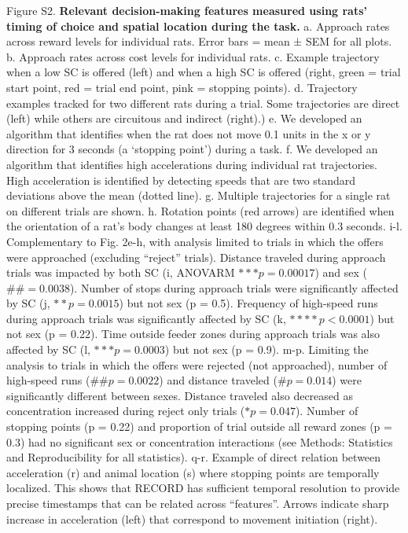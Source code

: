 \documentclass{article}
\begin{document}
\begin{singlespace}
\noindent Figure S2. \textbf{Relevant decision-making features measured using rats’ timing of choice and spatial location during the task.} 
a. Approach rates across reward levels for individual rats. Error bars = mean ± SEM for all plots.
b. Approach rates across cost levels for individual rats.
c. Example trajectory when a low SC is offered (left) and when a high SC is offered (right, green
= trial start point, red = trial end point, pink = stopping points).
d. Trajectory examples tracked for two different rats during a trial. Some trajectories are direct
(left) while others are circuitous and indirect (right).)
e. We developed an algorithm that identifies when the rat does not move 0.1 units in the x or y
direction for 3 seconds (a \lq{stopping point}\rq) during a task.
f. We developed an algorithm that identifies high accelerations during individual rat trajectories.
High acceleration is identified by detecting speeds that are two standard deviations above the
mean (dotted line).
g. Multiple trajectories for a single rat on different trials are shown.
h. Rotation points (red arrows) are identified when the orientation of a rat’s body changes at least
180 degrees within 0.3 seconds.
i-l. Complementary to Fig. 2e-h, with analysis limited to trials in which the offers were approached
(excluding “reject” trials). Distance traveled during approach trials was impacted by both SC (i,
ANOVARM $***p = 0.00017$) and sex ($\#\# = 0.0038$). Number of stops during approach trials were
significantly affected by SC (j, $**p = 0.0015$) but not sex (p = 0.5). Frequency of high-speed runs
during approach trials was significantly affected by SC (k, $****p < 0.0001$) but not sex (p = 0.22).
Time outside feeder zones during approach trials was also affected by SC (l, $***p = 0.0003$) but
not sex (p = 0.9).
m-p. Limiting the analysis to trials in which the offers were rejected (not approached), number of
high-speed runs ($\#\#p = 0.0022$) and distance traveled ($\#p = 0.014$) were significantly different
between sexes. Distance traveled also decreased as concentration increased during reject only
trials ($*p = 0.047$). Number of stopping points (p = 0.22) and proportion of trial outside all reward
zones (p = 0.3) had no significant sex or concentration interactions (see Methods: Statistics and Reproducibility for all statistics). q-r. Example of direct relation between acceleration (r) and animal location (s) where stopping
points are temporally localized. This shows that RECORD has sufficient temporal resolution to provide precise 
timestamps that can be related across “features”. Arrows indicate sharp increase in acceleration (left) that 
correspond to movement initiation (right).
\end{singlespace}
\end{document}
